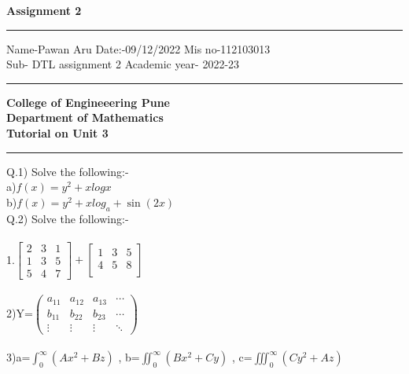 \documentclass[12pt,a4paper]{article}
\begin{document}
 

\begin{center}
\huge \bf {Assignment 2}
\end{center}  
\hrule
\begin{flushleft}
Name-Pawan Aru \hspace{1cm} Date:-09/12/2022 \hspace{1cm} Mis no-112103013 \\
\vspace{1mm}
Sub- DTL assignment 2 \hspace{1cm}Academic year- 2022-23\\
\vspace{1mm}
\end{flushleft}
\hrule
\vspace{2mm}
\begin{large}
\begin{center}
\textbf{College of Engineeering Pune}\\
\textbf{Department of Mathematics}\\
\textbf{Tutorial on Unit 3}\\
\end{center}
\end{large}
\hrule
\vspace{0.5cm}
\noindent Q.1) Solve the following:-
\\
a)\(\displaystyle f(x)=y^2+xlog{x}\)\\\vspace{4mm}
b)\(\displaystyle f(x)=y^2+xlog_a+\sin(2x)\)
\\
\noindent Q.2) Solve the following:-
\\
\vspace{1mm}
\\
1.$\begin{bmatrix}
2&3&1\\
1&3&5\\
5&4&7
\end{bmatrix}
+
\begin{bmatrix}
1&3&5\\
4&5&8\\
\end{bmatrix}
$
\\
\vspace{3mm}
\\
2)Y=$\begin{pmatrix}
a_{11} & a_{12} & a_{13} & \cdots\\
b_{11} & b_{22} & b_{23} & \cdots\\
\vdots & \vdots & \vdots & \ddots
\end{pmatrix}
$\\
\vspace{2mm}
\\
3)a=\(\displaystyle \int_0^\infty(Ax^2+Bz)\) , b=\(\displaystyle \iint_0^\infty(Bx^2+Cy)\) , c=\(\displaystyle \iiint_0^\infty(Cy^2+Az)\)\\
\end{document}
